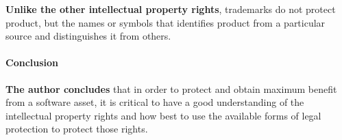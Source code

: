 \documentclass{article}
\begin{document}
\textbf{Unlike the other intellectual property rights}, trademarks do not protect product, but the names or symbols that identifies product from a particular source and distinguishes it from others.

\paragraph{Conclusion}

\textbf{The author concludes} that in order to protect and obtain maximum benefit from a software asset, it is critical to have a good understanding of the intellectual property rights and how best to use the available forms of legal protection to protect those rights.
\end{document}
